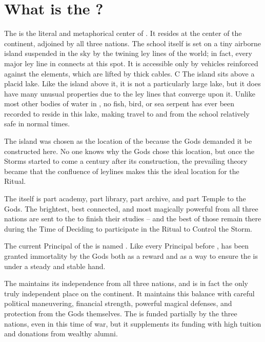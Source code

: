 \documentclass[blue]{GL2020}
\begin{document}
\name{\bSchool{}}

\section*{What is the \pSchool{}?}

The \pSchool{} is the literal and metaphorical center of \pEarth{}. It resides at the center of the continent, adjoined by all three nations. The school itself is set on a tiny airborne island suspended in the sky by the twining ley lines of the world; in fact, every major ley line in \pEarth{} connects at this spot. It is accessible only by vehicles reinforced against the elements, which are lifted by thick cables. 
C
The island sits above a placid lake. Like the island above it, it is not a particularly large lake, but it does have many unusual properties due to the ley lines that converge upon it. Unlike most other bodies of water in \pEarth{}, no fish, bird, or sea serpent has ever been recorded to reside in this lake, making travel to and from the school relatively safe in normal times.

The island was chosen as the location of the \pSc{} because the Gods demanded it be constructed here. No one knows why the Gods chose this location, but once the Storms started to come a century after its construction, the prevailing theory became that the confluence of leylines makes this the ideal location for the Ritual.

The \pSc{} itself is part academy, part library, part archive, and part Temple to the Gods. The brightest, best connected, and most magically powerful from all three nations are sent to the \pSchool{} to finish their studies -- and the best of those remain there during the Time of Deciding to participate in the Ritual to Control the Storm.

The current Principal of the \pSc{} is named \cPrincipal{}. Like every Principal before \cPrincipal{\them}, \cPrincipal{} has been granted immortality by the Gods both as a reward and as a way to ensure the \pSc{} is under a steady and stable hand. 

The \pSc{} maintains its independence from all three nations, and is in fact the only truly independent place on the continent. It maintains this balance with careful political maneuvering, financial strength, powerful magical defenses, and protection from the Gods themselves. The \pSc{} is funded partially by the three nations, even in this time of war, but it supplements its funding with high tuition and donations from wealthy alumni.
\end{document}

